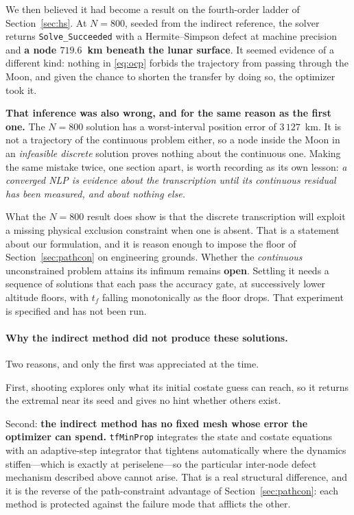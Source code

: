 \documentclass[11pt]{article}
\newcommand{\code}[1]{\texttt{#1}}
\begin{document}
We then believed it had become a result on the fourth-order ladder of
Section~\ref{sec:hs}. At $N = 800$, seeded from the indirect reference, the
solver returns \code{Solve\_Succeeded} with a Hermite--Simpson defect at machine
precision and \textbf{a node $719.6$~km beneath the lunar surface}. It seemed
evidence of a different kind: nothing in \eqref{eq:ocp} forbids the trajectory
from passing through the Moon, and given the chance to shorten the transfer by
doing so, the optimizer took it.

\textbf{That inference was also wrong, and for the same reason as the first
one.} The $N = 800$ solution has a worst-interval position error of
$3\,127$~km. It is not a trajectory of the continuous problem either, so a node
inside the Moon in an \emph{infeasible discrete} solution proves nothing about
the continuous one. Making the same mistake twice, one section apart, is worth
recording as its own lesson: \emph{a converged NLP is evidence about the
transcription until its continuous residual has been measured, and about nothing
else.}

What the $N = 800$ result does show is that the discrete transcription will
exploit a missing physical exclusion constraint when one is absent. That is a
statement about our formulation, and it is reason enough to impose the floor of
Section~\ref{sec:pathcon} on engineering grounds. Whether the \emph{continuous}
unconstrained problem attains its infimum remains \textbf{open}. Settling it
needs a sequence of solutions that each pass the accuracy gate, at successively
lower altitude floors, with $t_f$ falling monotonically as the floor drops. That
experiment is specified and has not been run.

\paragraph{Why the indirect method did not produce these solutions.} Two
reasons, and only the first was appreciated at the time.

First, shooting explores only what its initial costate guess can reach, so it
returns the extremal near its seed and gives no hint whether others exist.

Second: \textbf{the indirect method has no fixed mesh whose error the optimizer
can spend.} \code{tfMinProp} integrates the state and costate equations with an
adaptive-step integrator that tightens automatically where the dynamics
stiffen---which is exactly at periselene---so the particular inter-node defect
mechanism described above cannot arise. That is a real structural difference,
and it is the reverse of the path-constraint advantage of
Section~\ref{sec:pathcon}: each method is protected against the failure mode
that afflicts the other.
\end{document}
